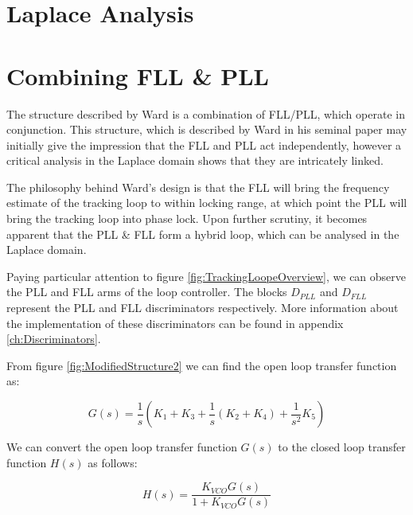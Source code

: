 \clearpage

\section{Laplace Analysis}

\section{Combining FLL \& PLL}

The structure described by Ward is a combination of FLL/PLL, which operate in conjunction. This structure, which is described by Ward in his seminal paper  may initially give the impression that the FLL and PLL act independently, however a critical analysis in the Laplace domain shows that they are intricately linked\cite{Ward}.

The philosophy behind Ward's design is that the FLL will bring the frequency estimate of the tracking loop to within locking range, at which point the PLL will bring the tracking loop into phase lock. Upon further scrutiny, it becomes apparent that the PLL \& FLL form a hybrid loop, which can be analysed in the Laplace domain.


Paying particular attention to figure \ref{fig:TrackingLoopeOverview}, we can observe the PLL and FLL arms of the loop controller. The blocks $D_{PLL}$ and $D_{FLL}$ represent the PLL and FLL discriminators respectively. More information about the implementation of these discriminators can be found in appendix \ref{ch:Discriminators}. 







From figure \ref{fig:ModifiedStructure2} we can find the open loop transfer function as:

\begin{equation}
G(s) = \frac{1}{s} (K_1+K_3 + \frac{1}{s}(K_2+K_4) + \frac{1}{s^2} K_5)
\label{eq:CombinedOpenLoopTF}
\end{equation}

We can convert the open loop transfer function $G(s)$ to the closed loop transfer function $H(s)$ as follows\cite{KazemiPHD,Gardner}:

\begin{equation}
 H(s) = \frac{K_{VCO}G(s)}{1+K_{VCO}G(s)}
\end{equation}


